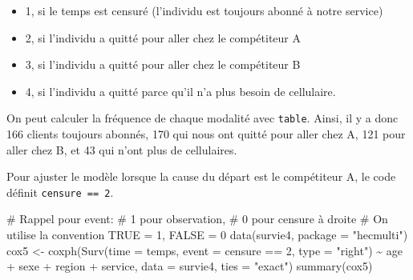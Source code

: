 \documentclass[
  11pt,
  letterpaper,
]{scrbook}
\newenvironment{Shaded}{\begin{snugshade}}{\end{snugshade}}
\newcommand{\AttributeTok}[1]{\textcolor[rgb]{0.40,0.45,0.13}{#1}}
\newcommand{\CommentTok}[1]{\textcolor[rgb]{0.37,0.37,0.37}{#1}}
\newcommand{\DecValTok}[1]{\textcolor[rgb]{0.68,0.00,0.00}{#1}}
\newcommand{\FunctionTok}[1]{\textcolor[rgb]{0.28,0.35,0.67}{#1}}
\newcommand{\NormalTok}[1]{\textcolor[rgb]{0.00,0.23,0.31}{#1}}
\newcommand{\OtherTok}[1]{\textcolor[rgb]{0.00,0.23,0.31}{#1}}
\newcommand{\SpecialCharTok}[1]{\textcolor[rgb]{0.37,0.37,0.37}{#1}}
\newcommand{\StringTok}[1]{\textcolor[rgb]{0.13,0.47,0.30}{#1}}
\providecommand{\tightlist}{%
  \setlength{\itemsep}{0pt}\setlength{\parskip}{0pt}}\usepackage{longtable,booktabs,array}
\theoremstyle{definition}
\theoremstyle{remark}
\begin{document}
\begin{itemize}
\tightlist
\item
  1, si le temps est censuré (l'individu est toujours abonné à notre
  service)
\item
  2, si l'individu a quitté pour aller chez le compétiteur A
\item
  3, si l'individu a quitté pour aller chez le compétiteur B
\item
  4, si l'individu a quitté parce qu'il n'a plus besoin de cellulaire.
\end{itemize}

On peut calculer la fréquence de chaque modalité avec \texttt{table}.
Ainsi, il y a donc 166 clients toujours abonnés, 170 qui nous ont quitté
pour aller chez A, 121 pour aller chez B, et 43 qui n'ont plus de
cellulaires.

Pour ajuster le modèle lorsque la cause du départ est le compétiteur A,
le code définit \texttt{censure\ ==\ 2}.

\begin{Shaded}
\begin{Highlighting}[]
\CommentTok{\# Rappel pour \textasciigrave{}event\textasciigrave{}:}
\CommentTok{\#   1 pour observation, }
\CommentTok{\#   0 pour censure à droite}
\CommentTok{\# On utilise la convention TRUE = 1, FALSE = 0}
\FunctionTok{data}\NormalTok{(survie4, }\AttributeTok{package =} \StringTok{"hecmulti"}\NormalTok{)}
\NormalTok{cox5 }\OtherTok{\textless{}{-}} \FunctionTok{coxph}\NormalTok{(}\FunctionTok{Surv}\NormalTok{(}\AttributeTok{time =}\NormalTok{ temps, }
                   \AttributeTok{event =}\NormalTok{ censure }\SpecialCharTok{==} \DecValTok{2}\NormalTok{,}
                   \AttributeTok{type =} \StringTok{"right"}\NormalTok{) }\SpecialCharTok{\textasciitilde{}} 
\NormalTok{                age }\SpecialCharTok{+}\NormalTok{ sexe }\SpecialCharTok{+}\NormalTok{ region }\SpecialCharTok{+}\NormalTok{ service, }
              \AttributeTok{data =}\NormalTok{ survie4,}
              \AttributeTok{ties =} \StringTok{"exact"}\NormalTok{)}
\FunctionTok{summary}\NormalTok{(cox5)}
\end{Highlighting}
\end{Shaded}
\end{document}
